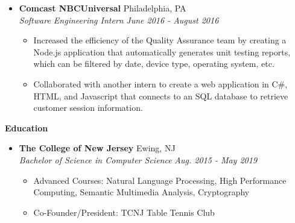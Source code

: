 \documentclass[letterpaper,10pt]{article}
\newcommand{\resitem}[1]{\item #1 \vspace{-2pt}}
\newcommand{\resheading}[1]{{\large \colorbox{mygrey}{\begin{minipage}{\textwidth}{\textbf{#1 \vphantom{p\^{E}}}}\end{minipage}}}}
\newcommand{\ressubheading}[4]{%
  \item\textbf{#1} \hfill #2\null\\
  \textit{#3} \hfill \textit{#4}%
  \vspace{-5pt}
}%
\begin{document}
\begin{itemize}
\ressubheading{Comcast NBCUniversal}{Philadelphia, PA}{Software Engineering Intern}{June 2016 - August 2016}
	\begin{itemize}
		\resitem{Increased the efficiency of the Quality Assurance team by creating a Node.js application that automatically generates unit testing reports, which can be filtered by date, device type, operating system, etc.}
		\resitem{Collaborated with another intern to create a web application in C\#, HTML, and Javascript that connects to an SQL database to retrieve customer session information.}
	\end{itemize}
\end{itemize}

\resheading{Education}
\begin{itemize}

\ressubheading{The College of New Jersey}{Ewing, NJ}{Bachelor of Science in Computer Science}{Aug. 2015 - May 2019}
	\begin{itemize}
		\resitem{Advanced Courses: Natural Language Processing, High Performance Computing, Semantic Multimedia Analysis, Cryptography}
		\resitem{Co-Founder/President: TCNJ Table Tennis Club}
	\end{itemize}
\end{itemize}
\end{document}
